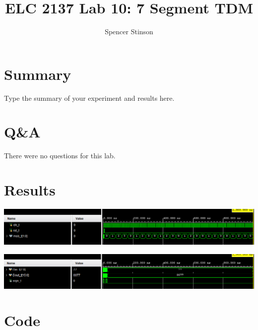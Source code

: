 \documentclass[11pt]{article}
\newcommand{\Verilog}[2][]{%
	
}
\begin{document}
\title{ELC 2137 Lab 10: 7 Segment TDM}
\author{Spencer Stinson}

\maketitle

\section*{Summary}

Type the summary of your experiment and results here.  


\section*{Q\&A}
There were no questions for this lab. 

\section*{Results}


\begin{center}
	\includegraphics[width=\textwidth]{test1}
\end{center}
\begin{center}
	\includegraphics[width=\textwidth]{show2ctest.png}
\end{center}
\section*{Code}

\Verilog[caption= Ncount module]{C:/Users/Spencer_stinson1/Documents/GitHub/Lab10/Lab_10/Lab_10.srcs/sources_1/new/Ncount.sv}
\Verilog[caption= Show 2's compliment module]{C:/Users/Spencer_stinson1/Documents/GitHub/Lab10/Lab_10/Lab_10.srcs/sources_1/new/show2c.sv}
\Verilog[caption=wrapper testing 
 module]{C:/Users/Spencer_stinson1/Documents/GitHub/Lab10/Lab_10/Lab_10.srcs/sources_1/new/wrapper.sv}
\Verilog[caption= calculator final module]{C:/Users/Spencer_stinson1/Documents/GitHub/Lab10/Lab_10/Lab_10.srcs/sources_1/new/calc.sv}

\Verilog[caption= Ncount test bench module]{C:/Users/Spencer_stinson1/Documents/GitHub/Lab10/Lab_10/Lab_10.srcs/sim_1/new/Ncount_testbench.sv}
\Verilog[caption= show2c test bench  module]{C:/Users/Spencer_stinson1/Documents/GitHub/Lab10/Lab_10/Lab_10.srcs/sim_1/new/show2c_testbench.sv}
\end{document}
